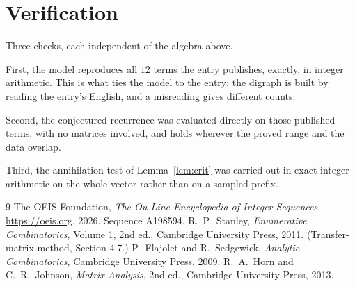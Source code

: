 \documentclass[11pt,a4paper]{article}
\theoremstyle{plain}
\theoremstyle{definition}
\begin{document}
\section{Verification}

Three checks, each independent of the algebra above.

First, the model reproduces all $12$ terms the entry publishes, exactly, in integer
arithmetic. This is what ties the model to the entry: the digraph is built by reading the
entry's English, and a misreading gives different counts.

Second, the conjectured recurrence was evaluated directly on those published terms, with no
matrices involved, and holds wherever the proved range and the data overlap.

Third, the annihilation test of Lemma~\ref{lem:crit} was carried out in exact integer
arithmetic on the whole vector rather than on a sampled prefix.

\begin{thebibliography}{9}
 The OEIS Foundation, \emph{The On-Line Encyclopedia of Integer
Sequences}, \url{https://oeis.org}, 2026. Sequence A198594.
 R.~P.~Stanley, \emph{Enumerative Combinatorics}, Volume 1, 2nd ed.,
Cambridge University Press, 2011. (Transfer-matrix method, Section 4.7.)
 P.~Flajolet and R.~Sedgewick, \emph{Analytic Combinatorics}, Cambridge
University Press, 2009.
 R.~A.~Horn and C.~R.~Johnson, \emph{Matrix Analysis}, 2nd ed., Cambridge
University Press, 2013.
\end{thebibliography}
\end{document}
